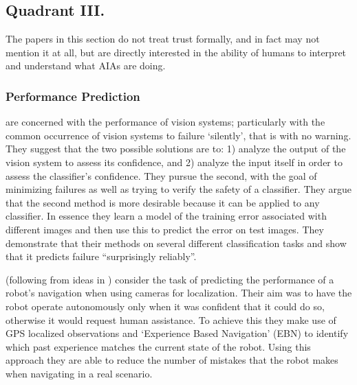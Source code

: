 \subsection{Quadrant III.}
The papers in this section do not treat trust formally, and in fact may not mention it at all, but are directly interested in the ability of humans to interpret and understand what AIAs are doing.

\subsubsection{Performance Prediction}
    \citet{Zhang2014-he} are concerned with the performance of vision systems; particularly with the common occurrence of vision systems to failure `silently', that is with no warning. They suggest that the two possible solutions are to: 1) analyze the output of the vision system to assess its confidence, and 2) analyze the input itself in order to assess the classifier's confidence. They pursue the second, with the goal of minimizing failures as well as trying to verify the safety of a classifier. They argue that the second method is more desirable because it can be applied to any classifier. In essence they learn a model of the training error associated with different images and then use this to predict the error on test images. They demonstrate that their methods on several different classification tasks and show that it predicts failure ``surprisingly reliably''.


    \citet{Gurau2016-hs} (following from ideas in \citet{Churchill2015-ei}) consider the task of predicting the performance of a robot's navigation when using cameras for localization. Their aim was to have the robot operate autonomously only when it was confident that it could do so, otherwise it would request human assistance. To achieve this they make use of GPS localized observations and `Experience Based Navigation' (EBN) to identify which past experience matches the current state of the robot. Using this approach they are able to reduce the number of mistakes that the robot makes when navigating in a real scenario.

